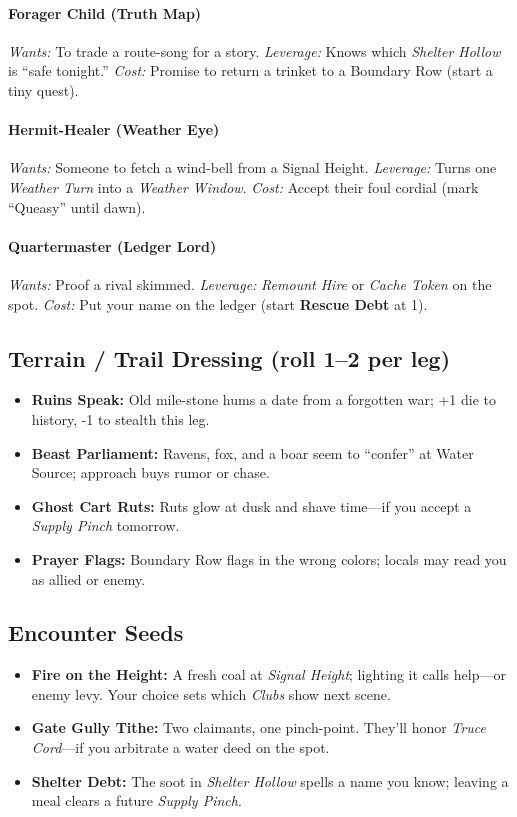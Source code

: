 \paragraph{Forager Child (Truth Map)}
\emph{Wants:} To trade a route-song for a story.  
\emph{Leverage:} Knows which \emph{Shelter Hollow} is “safe tonight.”  
\emph{Cost:} Promise to return a trinket to a Boundary Row (start a tiny quest).

\paragraph{Hermit-Healer (Weather Eye)}
\emph{Wants:} Someone to fetch a wind-bell from a Signal Height.  
\emph{Leverage:} Turns one \emph{Weather Turn} into a \emph{Weather Window}.  
\emph{Cost:} Accept their foul cordial (mark “Queasy” until dawn).

\paragraph{Quartermaster (Ledger Lord)}
\emph{Wants:} Proof a rival skimmed.  
\emph{Leverage:} \emph{Remount Hire} or \emph{Cache Token} on the spot.  
\emph{Cost:} Put your name on the ledger (start \textbf{Rescue Debt} at 1).
\subsection*{Terrain / Trail Dressing (roll 1–2 per leg)}

\begin{itemize}
\item \textbf{Ruins Speak:} Old mile-stone hums a date from a forgotten war; +1 die to history, -1 to stealth this leg.
\item \textbf{Beast Parliament:} Ravens, fox, and a boar seem to “confer” at Water Source; approach buys rumor or chase.
\item \textbf{Ghost Cart Ruts:} Ruts glow at dusk and shave time—if you accept a \emph{Supply Pinch} tomorrow.
\item \textbf{Prayer Flags:} Boundary Row flags in the wrong colors; locals may read you as allied or enemy.
\end{itemize}
\subsection*{Encounter Seeds}

\begin{itemize}
\item \textbf{Fire on the Height:} A fresh coal at \emph{Signal Height}; lighting it calls help—or enemy levy. Your choice sets which \emph{Clubs} show next scene.
\item \textbf{Gate Gully Tithe:} Two claimants, one pinch-point. They’ll honor \emph{Truce Cord}—if you arbitrate a water deed on the spot.
\item \textbf{Shelter Debt:} The soot in \emph{Shelter Hollow} spells a name you know; leaving a meal clears a future \emph{Supply Pinch}.
\end{itemize}
